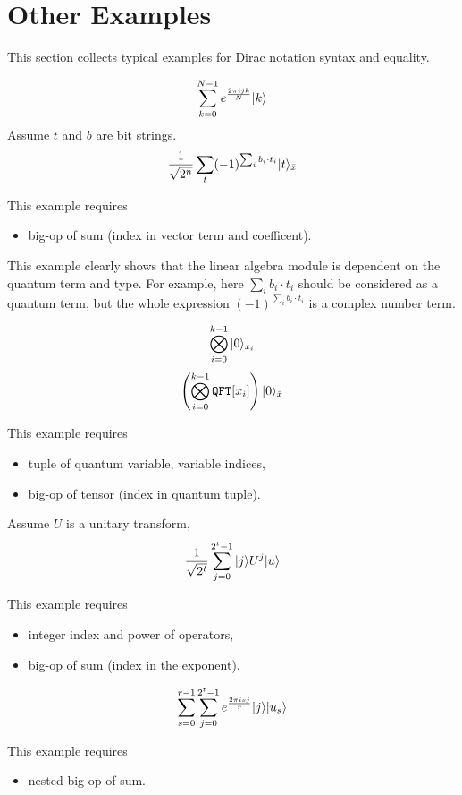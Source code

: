 


\section{Other Examples}

This section collects typical examples for Dirac notation syntax and equality.

\begin{example}
  $$
  \sum_{k=0}^{N-1} e^{\frac{2\pi i j k}{N}}|k\rangle
  $$
  Assume $t$ and $b$ are bit strings.
  $$
  \frac{1}{\sqrt{2^n}} \sum_t (-1)^{\sum_i b_i \cdot t_i} |t\rangle_{\bar{x}}
  $$\end{example}
This example requires
\begin{itemize}
  \item big-op of sum (index in vector term and coefficent).
\end{itemize}
This example clearly shows that the linear algebra module is dependent on the quantum term and type. For example, here $\sum_i b_i \cdot t_i$ should be considered as a quantum term, but the whole expression $(-1)^{\sum_i b_i \cdot t_i}$ is a complex number term.



\begin{example}
  $$
  \bigotimes_{i = 0}^{k-1} |0\rangle_{x_i}
  $$
  $$
  \left ( \bigotimes_{i = 0}^{k-1} \texttt{QFT}[x_i] \right ) |0\rangle_{\bar{x}}
  $$
\end{example}
This example requires 
\begin{itemize}
  \item tuple of quantum variable, variable indices,
  \item big-op of tensor (index in quantum tuple).
\end{itemize}

\begin{example}
  Assume $U$ is a unitary transform,
  $$
  \frac{1}{\sqrt{2^t}} \sum_{j=0}^{2^t-1} |j\rangle U^j |u\rangle
  $$
\end{example}
This example requires
\begin{itemize}
  \item integer index and power of operators,
  \item big-op of sum (index in the exponent).
\end{itemize}

\begin{example}
  $$
  \sum_{s=0}^{r-1} \sum_{j=0}^{2^t-1} e^{\frac{2\pi i s j}{r}} |j\rangle |u_s\rangle
  $$
\end{example}
This example requires
\begin{itemize}
  \item nested big-op of sum.
\end{itemize}


